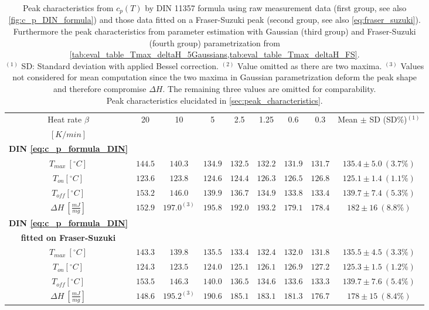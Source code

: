 \documentclass{scrartcl}[12pt, halfparskip]
\numberwithin{equation}{section}
\numberwithin{figure}{section}
\numberwithin{table}{section}
\begin{document}
\begin{table}[H]
	\caption{Peak characteristics from $c_p(T)$ by DIN 11357 formula using raw measurement data (first group, see also \cref{fig:c_p_DIN_formula}) and those data fitted on a Fraser-Suzuki peak (second group, see also \cref{eq:fraser_suzuki}). Furthermore the peak characteristics from parameter estimation with Gaussian (third group) and Fraser-Suzuki (fourth group) parametrization from \cref{tab:eval_table_Tmax_deltaH_5Gaussians,tab:eval_table_Tmax_deltaH_FS}. \\
	$^{(1)}$ SD: Standard deviation with applied Bessel correction. $^{(2)}$ Value omitted as there are two maxima. 
	$^{(3)}$ Values not considered for mean computation since the two maxima in Gaussian parametrization deform the peak shape and therefore compromise $\Delta H$. The remaining three values are omitted for comparability. \\
	Peak characteristics elucidated in \cref{sec:peak_characteristics}.}
	\hspace{-1.7cm}
	\begin{tabular}{| c | c | c | c | c | c | c | c || c |} \hline
		Heat rate $\beta$ & 20 & 10 & 5 & 2.5 & 1.25 & 0.6 & 0.3 & Mean $\pm$ SD (SD\%)$^{(1)}$ \\
		$[K/min]$ & & & & & & & & \\ \hline
		\textbf{DIN \cref{eq:c_p_formula_DIN}} & & & & & & & & \\[0.7ex]
		$T_{max} \ [^{\circ}C]$ & $144.5$ & $140.3$ & $134.9$ & $132.5$ & $132.2$ & $131.9$ & $131.7$ & $135.4 \pm 5.0 \ (3.7\%)$ \\[0.7ex]
		$T_{on} [^{\circ} C]$ & $123.6$ & $123.8$ & $124.6$ & $124.4$ & $126.3$ & $126.5$ & $126.8$ & $125.1 \pm 1.4 \ (1.1\%)$ \\[0.7ex]
		$T_{off} [^{\circ} C]$ & $153.2$ & $146.0$ & $139.9$ & $136.7$ & $134.9$ & $133.8$ & $133.4$ & $139.7 \pm 7.4 \ (5.3\%)$ \\[0.7ex]
		$\Delta H \ [\frac{mJ}{mg}]$ & $152.9$ & $197.0^{(3)}$ & $195.8$ & $192.0$ & $193.2$ & $179.1$ & $178.4$ & $182 \pm 16 \ (8.8\%)$ \\ \hline

		\textbf{DIN \cref{eq:c_p_formula_DIN}} & & & & & & & & \\
		\textbf{fitted on Fraser-Suzuki} & & & & & & & & \\
		$T_{max} \ [^{\circ}C]$ & $143.3$ & $139.8$ & $135.5$ & $133.4$ & $132.4$ & $132.0$ & $131.8$ & $135.5 \pm 4.5 \ (3.3\%)$ \\[0.7ex]
		$T_{on} [^{\circ} C]$ & $124.3$ & $123.5$ & $124.0$ & $125.1$ & $126.1$ & $126.9$ & $127.2$ & $125.3 \pm 1.5 \ (1.2\%)$ \\[0.7ex]
		$T_{off} [^{\circ} C]$ & $153.5$ & $146.3$ & $140.0$ & $136.5$ & $134.6$ & $133.6$ & $133.3$ & $139.7 \pm 7.6 \ (5.4\%)$ \\[0.7ex]
		$\Delta H \ [\frac{mJ}{mg}]$ & $148.6$ & $195.2^{(3)}$ & $190.6$ & $185.1$ & $183.1$ & $181.3$ & $176.7$ & $178 \pm 15 \ (8.4\%)$ \\ \hline
		

\end{tabular}
\end{table}
\end{document}
